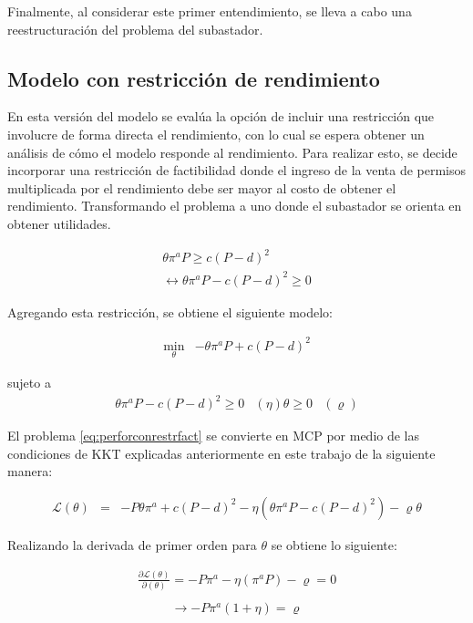 Finalmente, al considerar este primer entendimiento, se lleva a cabo una reestructuración del problema del subastador.


\subsection{Modelo con restricción de rendimiento}\label{modelo:conrendimiento}

En esta versión del modelo se evalúa la opción de incluir una restricción que involucre de forma directa el rendimiento, con lo cual se espera obtener un análisis de cómo el modelo responde al rendimiento. Para realizar esto, se decide incorporar una restricción de factibilidad donde el ingreso de la venta de permisos multiplicada por el rendimiento debe ser mayor al costo de obtener el rendimiento. Transformando el problema a uno donde el subastador se orienta en obtener utilidades.

\begin{align}
\theta \pi^a P  \geq  c(P-d)^2 \\
\leftrightarrow \theta \pi^a P - c(P-d)^2 \geq 0  
\end{align}

\vspace{2.5mm}

Agregando esta restricción, se obtiene el siguiente modelo: 

\begin{eqnarray}
\min_{\theta} & -\theta \pi^aP + c(P-d)^2\label{eq:perforconrestrfact}
\end{eqnarray}

sujeto a
\begin{eqnarray}
    \theta \pi^a P - c(P-d)^2 \geq 0 & (\eta)  \label{perforconrestrfact:r1}
    \theta \geq 0 & (\varrho)
\end{eqnarray}

El problema \ref{eq:perforconrestrfact} se convierte en MCP por medio de las condiciones de KKT explicadas anteriormente en este trabajo de la siguiente manera: 

\begin{eqnarray}
\mathcal{L}(\theta)&=&-P\theta\pi^a+c(P-d)^2 -\eta(\theta \pi^a P - c(P-d)^2)- \varrho\theta 
\end{eqnarray}


Realizando la derivada de primer orden para $\theta$ se obtiene lo siguiente:

\begin{equation}
\begin{array}{rrclcl}
    \frac{\partial\mathcal{L}(\theta)}{\partial (\theta)}=-P\pi^a-\eta(\pi^a P) -\varrho=0 \label{lag30}\\
\end{array}
\end{equation}
\begin{equation}
\begin{array}{rrclcl}
    \rightarrow -P\pi^a(1+\eta)=\varrho \label{lag31}\\
\end{array}
\end{equation}

